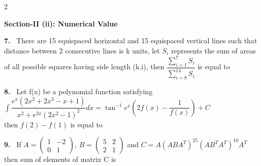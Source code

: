 \documentclass[10pt]{extarticle}
\newcommand{\sect}[1]{\par\smallskip\noindent\textbf{#1}\par}
\newcommand{\qn}[1]{\par\smallskip\noindent\textbf{#1.}~}
\begin{document}
\begin{multicols}{2}
\sect{Section-II (ii): Numerical Value}

\qn{7} There are 15 equispaced horizontal and 15 equispaced vertical lines such that distance between 2 consecutive lines is k units, let $S_i$ represents the sum of areas of all possible squares having side length (k.i), then $\dfrac{\displaystyle\sum_{i=1}^7S_i}{\displaystyle\sum_{i=8}^{14}S_i}$ is equal to

\qn{8} Let f(x) be a polynomial function satisfying $\displaystyle\int\dfrac{e^x(2x^2+2x^3-x+1)}{x^2+e^{2x}(2x^2-1)^2}dx=\tan^{-1}e^x\left(2f(x)-\dfrac{1}{f(x)}\right)+C$\\
then $f(2)-f(1)$ is equal to

\qn{9} If $A=\begin{pmatrix}1&-2\\0&1\end{pmatrix}$, $B=\begin{pmatrix}5&2\\2&1\end{pmatrix}$ and $C=A(ABA^T)^{25}(AB^TA^T)^{10}A^T$ then sum of elements of matrix C is

\end{multicols}
\end{document}
